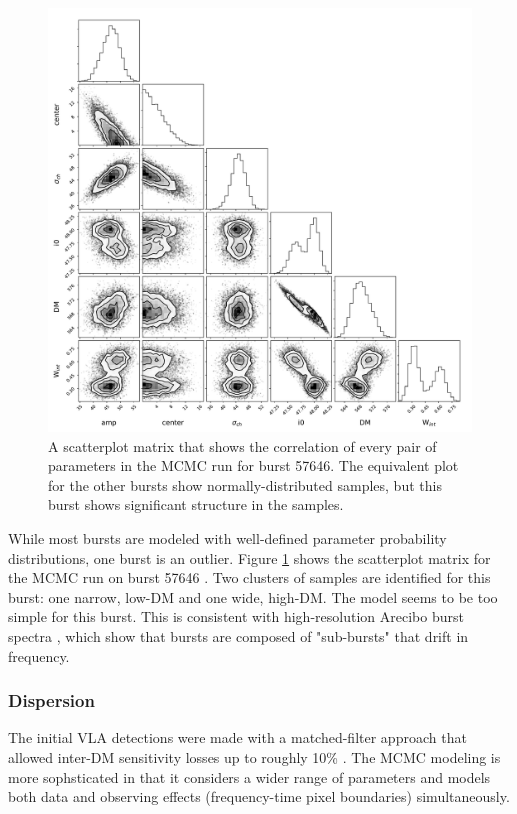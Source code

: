 \documentclass[twocolumn]{aastex61}
\begin{document}
\begin{figure}[htb]
\begin{center}
\includegraphics[width=0.9\columnwidth]{corner57646}
\caption{A scatterplot matrix that shows the correlation of every pair of parameters in the MCMC run for burst 57646. The equivalent plot for the other bursts show normally-distributed samples, but this burst shows significant structure in the samples.
\label{fig:corner}}
\end{center}
\end{figure}

While most bursts are modeled with well-defined parameter probability distributions, one burst is an outlier. Figure \ref{fig:corner} shows the scatterplot matrix for the MCMC run on burst 57646 \citep{corner}. Two clusters of samples are identified for this burst: one narrow, low-DM and one wide, high-DM. The model seems to be too simple for this burst. This is consistent with high-resolution Arecibo burst spectra \citep{WEIRD}, which show that bursts are composed of "sub-bursts" that drift in frequency.

\subsubsection{Dispersion}
The initial VLA detections were made with a matched-filter approach that allowed inter-DM sensitivity losses up to roughly 10\% \citep[$\Delta DM=10\ \rm{pc}\ \rm{cm}^{-3}$][]{2003ApJ...596.1142C}. 
The MCMC modeling is more sophsticated in that it considers a wider range of parameters and models both data and observing effects (frequency-time pixel boundaries) simultaneously.
\end{document}
